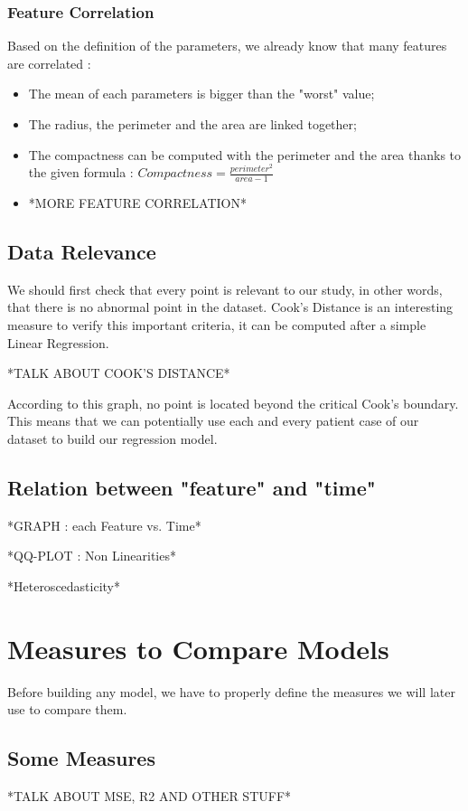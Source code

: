 \documentclass[]{report}
\begin{document}
\subsubsection{Feature Correlation}
Based on the definition of the parameters, we already know that many features are correlated :
\begin{itemize}
	\item The mean of each parameters is bigger than the "worst" value;
	\item The radius, the perimeter and the area are linked together;
	\item The compactness can be computed with the perimeter and the area thanks to the given formula : $Compactness = \frac{perimeter^2}{area - 1}$
	\item *MORE FEATURE CORRELATION*
\end{itemize}

\subsection{Data Relevance}
We should first check that every point is relevant to our study, in other words, that there is no abnormal point in the dataset. Cook's Distance is an interesting measure to verify this important criteria, it can be computed after a simple Linear Regression.

*TALK ABOUT COOK'S DISTANCE*

According to this graph, no point is located beyond the critical Cook's boundary. This means that we can potentially use each and every patient case of our dataset to build our regression model. 

\subsection{Relation between "feature" and "time"}
*GRAPH : each Feature vs. Time*

*QQ-PLOT : Non Linearities*

*Heteroscedasticity*


\section{Measures to Compare Models}
Before building any model, we have to properly define the measures we will later use to compare them. 

\subsection{Some Measures}
*TALK ABOUT MSE, R2 AND OTHER STUFF*
\end{document}
